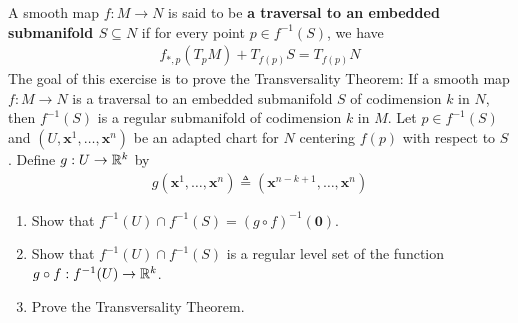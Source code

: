 \documentclass{report}
\begin{document}
\begin{question}{}{}
A smooth map $f:M\rightarrow N$ is said to be  \textbf{a traversal to an embedded submanifold $S\subseteq N$} if for every point $p \in f^{-1}(S)$, we have 
\begin{align*}
f_{*,p}(T_pM)+T_{f(p)}S=T_{f(p)}N
\end{align*}
The goal of this exercise is to prove the Transversality Theorem: If a smooth map $f:M\rightarrow N$ is a traversal to an embedded submanifold $S$ of codimension $k$ in  $N$, then  $f^{-1}(S)$ is a regular submanifold of codimension $k$ in  $M$. Let  $p \in f^{-1}(S)$ and $(U,\textbf{x}^1,\dots ,\textbf{x}^n)$ be an adapted chart for $N$ centering $f(p)$ with respect to $S$. Define $g:U\rightarrow \mathbb{R}^k$ by 
\begin{align*}
g(\textbf{x}^1,\dots ,\textbf{x}^n)\triangleq (\textbf{x}^{n-k+1},\dots ,\textbf{x}^{n})
\end{align*}
\begin{enumerate}[label=(\alph*)]
  \item Show that $f^{-1}(U)\cap f^{-1}(S)=(g\circ f)^{-1}(\textbf{0})$. 
  \item Show that $f^{-1}(U)\cap f^{-1}(S)$ is a regular level set of the function $g\circ f:f^{-1}(U)\rightarrow \mathbb{R}^{k}$. 
  \item Prove the Transversality Theorem. 
\end{enumerate}
\end{question}
\end{document}

